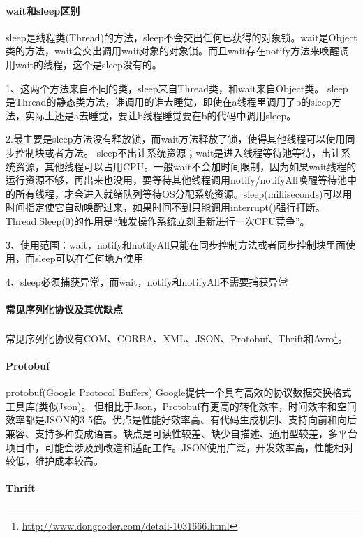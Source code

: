 \documentclass[../../../interview-questions.tex]{subfiles}
\begin{document}
\paragraph{wait和sleep区别}

sleep是线程类(Thread)的方法，sleep不会交出任何已获得的对象锁。wait是Object类的方法，wait会交出调用wait对象的对象锁。而且wait存在notify方法来唤醒调用wait的线程，这个是sleep没有的。

1、这两个方法来自不同的类，sleep来自Thread类，和wait来自Object类。
sleep是Thread的静态类方法，谁调用的谁去睡觉，即使在a线程里调用了b的sleep方法，实际上还是a去睡觉，要让b线程睡觉要在b的代码中调用sleep。

2.最主要是sleep方法没有释放锁，而wait方法释放了锁，使得其他线程可以使用同步控制块或者方法。
sleep不出让系统资源；wait是进入线程等待池等待，出让系统资源，其他线程可以占用CPU。一般wait不会加时间限制，因为如果wait线程的运行资源不够，再出来也没用，要等待其他线程调用notify/notifyAll唤醒等待池中的所有线程，才会进入就绪队列等待OS分配系统资源。sleep(milliseconds)可以用时间指定使它自动唤醒过来，如果时间不到只能调用interrupt()强行打断。
Thread.Sleep(0)的作用是“触发操作系统立刻重新进行一次CPU竞争”。

3、使用范围：wait，notify和notifyAll只能在同步控制方法或者同步控制块里面使用，而sleep可以在任何地方使用

4、sleep必须捕获异常，而wait，notify和notifyAll不需要捕获异常


\paragraph{常见序列化协议及其优缺点}

常见序列化协议有COM、CORBA、XML、JSON、Protobuf、Thrift和Avro\footnote{\url{http://www.dongcoder.com/detail-1031666.html}}。

\paragraph{Protobuf}protobuf(Google Protocol Buffers)
Google提供一个具有高效的协议数据交换格式工具库(类似Json)。
但相比于Json，Protobuf有更高的转化效率，时间效率和空间效率都是JSON的3-5倍。优点是性能好效率高、有代码生成机制、支持向前和向后兼容、支持多种变成语言。缺点是可读性较差、缺少自描述、通用型较差，多平台项目中，可能会涉及到改造和适配工作。JSON使用广泛，开发效率高，性能相对较低，维护成本较高。

\paragraph{Thrift}
\end{document}
